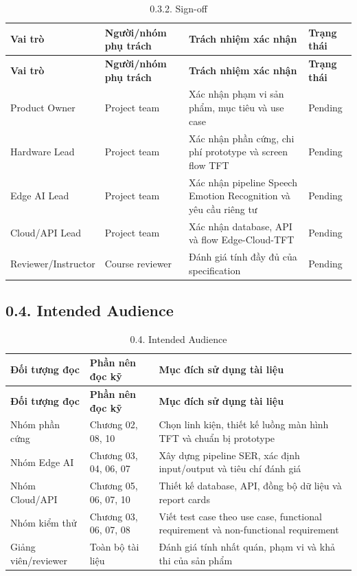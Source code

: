 \documentclass[12pt,a4paper]{article}
\begin{document}
\begin{center}
\scriptsize
\begin{longtable}{|P{0.18\textwidth}|P{0.25\textwidth}|P{0.25\textwidth}|P{0.22\textwidth}|}
\caption{0.3.2. Sign-off}\\
\hline
\textbf{Vai trò} & \textbf{Người/nhóm phụ trách} & \textbf{Trách nhiệm xác nhận} & \textbf{Trạng thái} \\
\hline
\endfirsthead
\hline
\textbf{Vai trò} & \textbf{Người/nhóm phụ trách} & \textbf{Trách nhiệm xác nhận} & \textbf{Trạng thái} \\
\hline
\endhead
Product Owner & Project team & Xác nhận phạm vi sản phẩm, mục tiêu và use case & Pending \\
\hline
Hardware Lead & Project team & Xác nhận phần cứng, chi phí prototype và screen flow TFT & Pending \\
\hline
Edge AI Lead & Project team & Xác nhận pipeline Speech Emotion Recognition và yêu cầu riêng tư & Pending \\
\hline
Cloud/API Lead & Project team & Xác nhận database, API và flow Edge-Cloud-TFT & Pending \\
\hline
Reviewer/Instructor & Course reviewer & Đánh giá tính đầy đủ của specification & Pending \\
\hline
\end{longtable}
\normalsize
\end{center}

\subsection*{0.4. Intended Audience}

\begin{center}
\begin{longtable}{|P{0.25\textwidth}|P{0.32\textwidth}|P{0.33\textwidth}|}
\caption{0.4. Intended Audience}\\
\hline
\textbf{Đối tượng đọc} & \textbf{Phần nên đọc kỹ} & \textbf{Mục đích sử dụng tài liệu} \\
\hline
\endfirsthead
\hline
\textbf{Đối tượng đọc} & \textbf{Phần nên đọc kỹ} & \textbf{Mục đích sử dụng tài liệu} \\
\hline
\endhead
Nhóm phần cứng & Chương 02, 08, 10 & Chọn linh kiện, thiết kế luồng màn hình TFT và chuẩn bị prototype \\
\hline
Nhóm Edge AI & Chương 03, 04, 06, 07 & Xây dựng pipeline SER, xác định input/output và tiêu chí đánh giá \\
\hline
Nhóm Cloud/API & Chương 05, 06, 07, 10 & Thiết kế database, API, đồng bộ dữ liệu và report cards \\
\hline
Nhóm kiểm thử & Chương 03, 06, 07, 08 & Viết test case theo use case, functional requirement và non-functional requirement \\
\hline
Giảng viên/reviewer & Toàn bộ tài liệu & Đánh giá tính nhất quán, phạm vi và khả thi của sản phẩm \\
\hline
\end{longtable}
\end{center}
\end{document}
